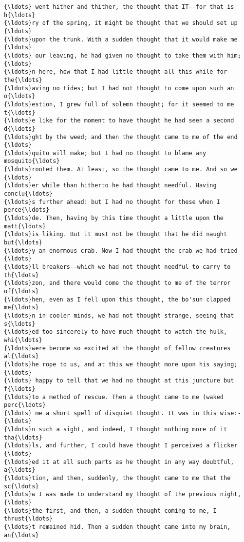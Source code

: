 \documentclass[11pt]{article}
\begin{document}
    \begin{Verbatim}[commandchars=\\\{\}]
{\ldots} went hither and thither, the thought that IT--for that is h{\ldots}
{\ldots}ry of the spring, it might be thought that we should set up {\ldots}
{\ldots}upon the trunk. With a sudden thought that it would make me {\ldots}
{\ldots} our leaving, he had given no thought to take them with him;{\ldots}
{\ldots}n here, how that I had little thought all this while for the{\ldots}
{\ldots}aving no tides; but I had not thought to come upon such an o{\ldots}
{\ldots}estion, I grew full of solemn thought; for it seemed to me t{\ldots}
{\ldots}e like for the moment to have thought he had seen a second d{\ldots}
{\ldots}ght by the weed; and then the thought came to me of the end {\ldots}
{\ldots}quito will make; but I had no thought to blame any mosquito{\ldots}
{\ldots}rooted them. At least, so the thought came to me. And so we {\ldots}
{\ldots}er while than hitherto he had thought needful. Having conclu{\ldots}
{\ldots}s further ahead: but I had no thought for these when I perce{\ldots}
{\ldots}de. Then, having by this time thought a little upon the matt{\ldots}
{\ldots}is liking. But it must not be thought that he did naught but{\ldots}
{\ldots}y an enormous crab. Now I had thought the crab we had tried {\ldots}
{\ldots}ll breakers--which we had not thought needful to carry to th{\ldots}
{\ldots}zon, and there would come the thought to me of the terror of{\ldots}
{\ldots}hen, even as I fell upon this thought, the bo'sun clapped me{\ldots}
{\ldots}n in cooler minds, we had not thought strange, seeing that s{\ldots}
{\ldots}ed too sincerely to have much thought to watch the hulk, whi{\ldots}
{\ldots}were become so excited at the thought of fellow creatures al{\ldots}
{\ldots}he rope to us, and at this we thought more upon his saying; {\ldots}
{\ldots} happy to tell that we had no thought at this juncture but f{\ldots}
{\ldots}to a method of rescue. Then a thought came to me (waked perc{\ldots}
{\ldots} me a short spell of disquiet thought. It was in this wise:-{\ldots}
{\ldots}n such a sight, and indeed, I thought nothing more of it tha{\ldots}
{\ldots}ls, and further, I could have thought I perceived a flicker {\ldots}
{\ldots}ed it at all such parts as he thought in any way doubtful, a{\ldots}
{\ldots}tion, and then, suddenly, the thought came to me that the sc{\ldots}
{\ldots}w I was made to understand my thought of the previous night,{\ldots}
{\ldots}the first, and then, a sudden thought coming to me, I thrust{\ldots}
{\ldots}t remained hid. Then a sudden thought came into my brain, an{\ldots}

\end{Verbatim}
\end{document}
